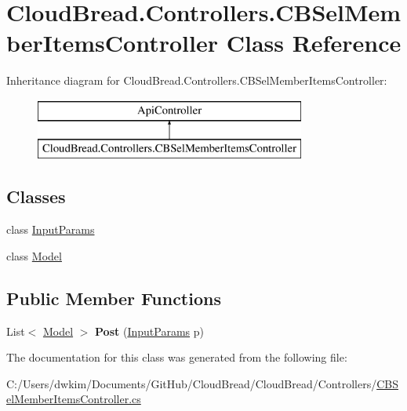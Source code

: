 \hypertarget{class_cloud_bread_1_1_controllers_1_1_c_b_sel_member_items_controller}{}\section{Cloud\+Bread.\+Controllers.\+C\+B\+Sel\+Member\+Items\+Controller Class Reference}
\label{class_cloud_bread_1_1_controllers_1_1_c_b_sel_member_items_controller}
Inheritance diagram for Cloud\+Bread.\+Controllers.\+C\+B\+Sel\+Member\+Items\+Controller\+:\begin{figure}[H]
\begin{center}
\leavevmode
\includegraphics[height=2.000000cm]{class_cloud_bread_1_1_controllers_1_1_c_b_sel_member_items_controller}
\end{center}
\end{figure}
\subsection*{Classes}
\begin{DoxyCompactItemize}
\item 
class \hyperlink{class_cloud_bread_1_1_controllers_1_1_c_b_sel_member_items_controller_1_1_input_params}{Input\+Params}
\item 
class \hyperlink{class_cloud_bread_1_1_controllers_1_1_c_b_sel_member_items_controller_1_1_model}{Model}
\end{DoxyCompactItemize}
\subsection*{Public Member Functions}
\begin{DoxyCompactItemize}
\item 
List$<$ \hyperlink{class_cloud_bread_1_1_controllers_1_1_c_b_sel_member_items_controller_1_1_model}{Model} $>$ {\bfseries Post} (\hyperlink{class_cloud_bread_1_1_controllers_1_1_c_b_sel_member_items_controller_1_1_input_params}{Input\+Params} p)\hypertarget{class_cloud_bread_1_1_controllers_1_1_c_b_sel_member_items_controller_a5e7fe0d95c6b9364f552f15e007f5acd}{}\label{class_cloud_bread_1_1_controllers_1_1_c_b_sel_member_items_controller_a5e7fe0d95c6b9364f552f15e007f5acd}

\end{DoxyCompactItemize}


The documentation for this class was generated from the following file\+:\begin{DoxyCompactItemize}
\item 
C\+:/\+Users/dwkim/\+Documents/\+Git\+Hub/\+Cloud\+Bread/\+Cloud\+Bread/\+Controllers/\hyperlink{_c_b_sel_member_items_controller_8cs}{C\+B\+Sel\+Member\+Items\+Controller.\+cs}\end{DoxyCompactItemize}
